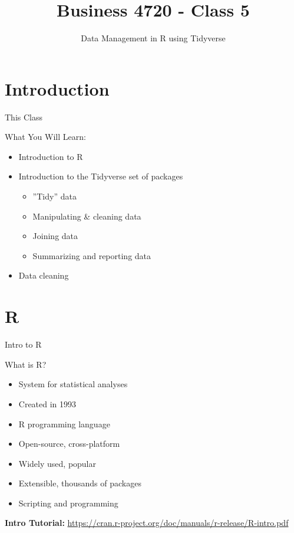 \documentclass[ignorenonframetext,xcolor=x11names]{beamer}
\title{Business 4720 - Class 5}
\subtitle{Data Management in R using Tidyverse}
\begin{document}
\begin{frame}[label=full]{}
  \titlepage
  \footnotesize
  
\end{frame}

\section{Introduction}

\begin{frame}[label=full]{This Class}

\begin{block}{What You Will Learn:}
\begin{itemize}
  \item Introduction to R
  \item Introduction to the Tidyverse set of packages
  \begin{itemize}
  \item ''Tidy'' data
  \item Manipulating \& cleaning data
  \item Joining data
  \item Summarizing and reporting data
  \end{itemize}
  \item Data cleaning
\end{itemize}
\end{block}
\end{frame}

\section{R}

\begin{frame}[label=full]{Intro to R}
\begin{block}{What is R?}
\begin{itemize}
  \item System for statistical analyses
  \item Created in 1993
  \item R programming language
  \item Open-source, cross-platform
  \item Widely used, popular
  \item Extensible, thousands of packages
  \item Scripting and programming
\end{itemize}  
\end{block}
\vspace{5mm}
\textbf{Intro Tutorial:}
\url{https://cran.r-project.org/doc/manuals/r-release/R-intro.pdf}
\end{frame}
\end{document}

